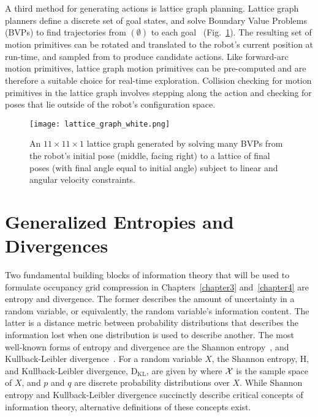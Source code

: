 A third method for generating actions is lattice graph planning. Lattice graph
planners define a discrete set of goal states, and
solve Boundary Value Problems (BVPs) to find trajectories from $(\emptyset)$ to
each goal~\cite{pivtoraiko2005generating,pivtoraiko2009differentially,pivtoraiko2013incremental}
(Fig.~\ref{fig:lattice_graph}). The resulting set of motion primitives can
be rotated and translated to the robot's current position at run-time, and sampled
from to produce candidate actions. Like forward-arc motion primitives, lattice
graph motion primitives can be pre-computed and are therefore a suitable choice for
real-time exploration. Collision checking for motion primitives in the lattice
graph involves stepping along the action and checking for poses that lie outside
of the robot's configuration space.
%
\begin{figure}[h]
  \centering
  \texttt{[image: lattice\_graph\_white.png]}
  \caption[A lattice graph of motion primitives.]{An $11\times 11 \times 1$ lattice graph generated by solving many
    BVPs
  from the robot's initial pose (middle, facing right) to a lattice of final
poses (with final angle equal to initial angle) subject to linear and angular velocity
constraints. \label{fig:lattice_graph}}
\end{figure}

\section{Generalized Entropies and Divergences}
\label{sec:entropy_and_divergence}

Two fundamental building blocks of information theory that will be used to
formulate occupancy grid compression in Chapters~\ref{chapter3}
and~\ref{chapter4} are entropy and
divergence. The former describes the amount of uncertainty in a random variable,
or equivalently, the random variable's information content. The latter is a
distance metric between probability distributions that describes the
information lost when one distribution is used to describe another.
The most well-known forms of entropy and divergence are the Shannon
entropy~\cite{shannon1948mathematical}, and
Kullback-Leibler divergence~\cite{kullback1951information}. For a random variable
$X$, the Shannon entropy, $\text{H}$, and Kullback-Leibler divergence,
$\text{D}_{\text{KL}}$, are given by
%
%
where $\mathcal{X}$ is the sample space of $X$, and $p$ and $q$ are discrete probability
distributions over $X$. While Shannon entropy and Kullback-Leibler divergence
succinctly describe critical concepts of information theory, alternative definitions of
these concepts exist.

